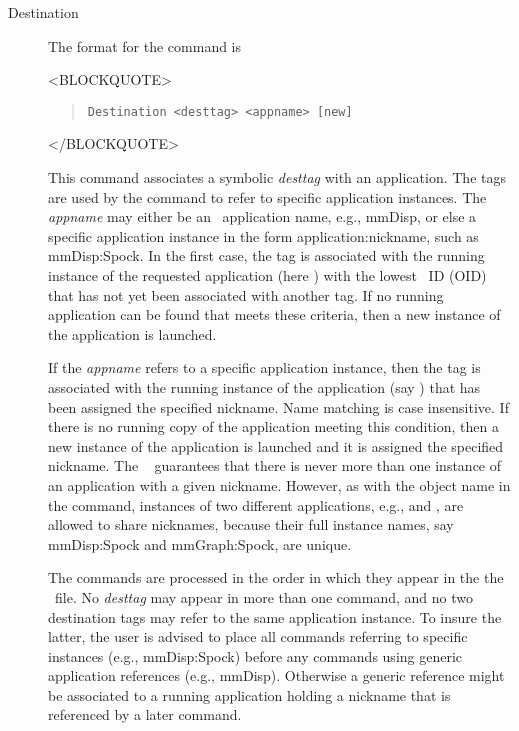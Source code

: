 \begin{description}
\item[Destination\label{html:destinationCmd}]
The format for the  command is
\begin{rawhtml}
<BLOCKQUOTE>
\end{rawhtml}
\begin{quote}
\begin{verbatim}
Destination <desttag> <appname> [new]
\end{verbatim}
\end{quote}
\begin{rawhtml}
</BLOCKQUOTE>
\end{rawhtml}
This command associates a symbolic \textit{desttag} with an
application.  The tags are used by the
 command
to refer to specific application instances.  The \textit{appname} may
either be an \OOMMF\ application name, e.g., mmDisp, or else a
specific application instance in the form application:nickname, such
as mmDisp:Spock.  In the first case, the tag is associated with the
running instance of the requested application (here ) with
the lowest \OOMMF\ ID (OID) that has not yet been associated with
another tag.  If no running application can be found that meets these
criteria, then a new instance of the application is launched.

If the \textit{appname} refers to a specific application instance, then
the tag is associated with the running instance of the application (say
) that has been assigned the specified nickname.  Name
matching is case insensitive.  If there is no running copy of the
application meeting this condition, then a new instance of the
application is launched and it is assigned the specified nickname.  The
\OOMMF\  guarantees
that there is never more than one instance of an application with a
given nickname.  However, as with the object name in the 
command, instances of two different applications, e.g.,  and
, are allowed to share nicknames, because their full
instance names, say mmDisp:Spock and mmGraph:Spock, are unique.

The  commands are processed in the order in which they
appear in the the \MIF\ file.  No \textit{desttag} may appear in more
than one  command, and no two destination tags may refer
to the same application instance.  To insure the latter, the user is
advised to place all  commands referring to specific
instances (e.g., mmDisp:Spock) before any  commands
using generic application references (e.g., mmDisp).  Otherwise a
generic reference might be associated to a running application holding a
nickname that is referenced by a later  command.


\end{description}
